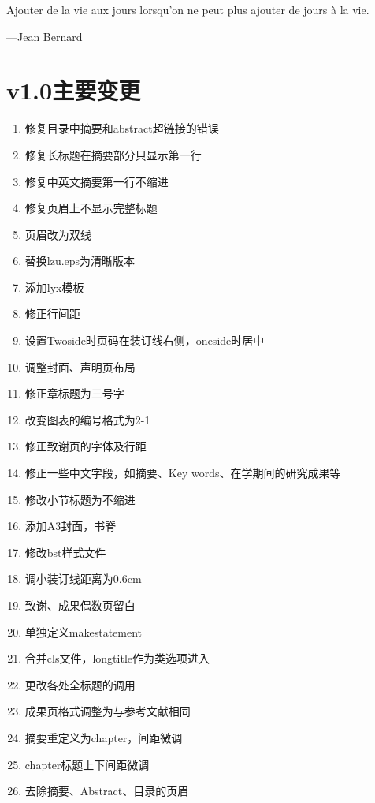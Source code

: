 \documentclass[twoside,longtitle]{LZUthesis}
\begin{document}
\begin{thanks}
Ajouter de la vie aux jours lorsqu'on ne peut plus ajouter de jours
à la vie.

\begin{flushright}
---Jean Bernard
\par\end{flushright}
\end{thanks}


\chapter{v1.0主要变更\label{chap:changelog}}
\begin{enumerate}
\item 修复目录中摘要和abstract超链接的错误
\item 修复长标题在摘要部分只显示第一行
\item 修复中英文摘要第一行不缩进
\item 修复页眉上不显示完整标题
\item 页眉改为双线
\item 替换lzu.eps为清晰版本
\item 添加lyx模板
\item 修正行间距
\item 设置Twoside时页码在装订线右侧，oneside时居中
\item 调整封面、声明页布局
\item 修正章标题为三号字
\item 改变图表的编号格式为2-1
\item 修正致谢页的字体及行距
\item 修正一些中文字段，如摘要、Key words、在学期间的研究成果等
\item 修改小节标题为不缩进
\item 添加A3封面，书脊
\item 修改bst样式文件
\item 调小装订线距离为0.6cm
\item 致谢、成果偶数页留白
\item 单独定义makestatement
\item 合并cls文件，longtitle作为类选项进入
\item 更改各处全标题的调用
\item 成果页格式调整为与参考文献相同
\item 摘要重定义为chapter，间距微调
\item chapter标题上下间距微调
\item 去除摘要、Abstract、目录的页眉
\end{enumerate}
\end{document}
